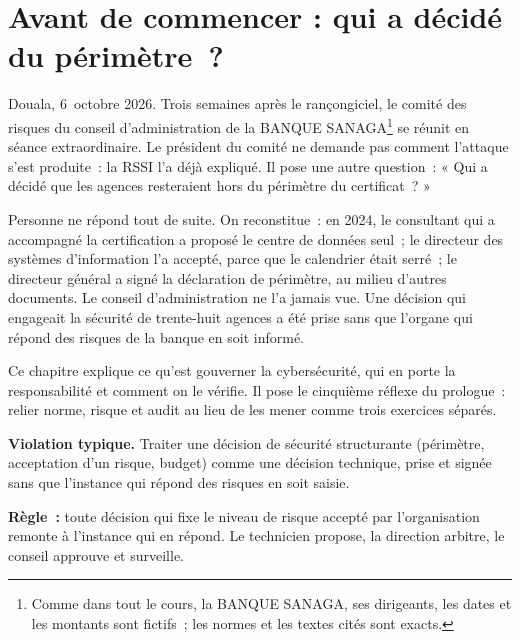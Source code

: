 \bigskip

\section*{Avant de commencer : qui a décidé du périmètre~?}

Douala, 6~octobre 2026. Trois semaines après le rançongiciel, le comité
des risques du conseil d'administration de la BANQUE SANAGA\footnote{Comme
dans tout le cours, la BANQUE SANAGA, ses dirigeants, les dates et les
montants sont fictifs~; les normes et les textes cités sont exacts.} se
réunit en séance extraordinaire. Le président du comité ne demande pas
comment l'attaque s'est produite~: la RSSI l'a déjà expliqué. Il pose une
autre question~: « Qui a décidé que les agences resteraient hors du
périmètre du certificat~? »

Personne ne répond tout de suite. On reconstitue~: en 2024, le consultant qui a
accompagné la certification a proposé le centre de données seul~; le
directeur des systèmes d'information l'a accepté, parce que le calendrier
était serré~; le directeur général a signé la déclaration de périmètre, au
milieu d'autres documents. Le conseil d'administration ne l'a jamais vue.
Une décision qui engageait la sécurité de trente-huit agences a été prise
sans que l'organe qui répond des risques de la banque en soit informé.

\medskip

Ce chapitre explique ce qu'est gouverner la cybersécurité, qui en porte la
responsabilité et comment on le vérifie. Il pose le cinquième réflexe du
prologue~: relier norme, risque et audit au lieu de les mener comme trois
exercices séparés.

\begin{boxalert}
\textbf{Violation typique.} Traiter une décision de sécurité structurante
(périmètre, acceptation d'un risque, budget) comme une décision technique,
prise et signée sans que l'instance qui répond des risques en soit saisie.

\smallskip
\textbf{Règle~:} toute décision qui fixe le niveau de risque accepté par
l'organisation remonte à l'instance qui en répond. Le technicien propose,
la direction arbitre, le conseil approuve et surveille.
\end{boxalert}

\separateur

